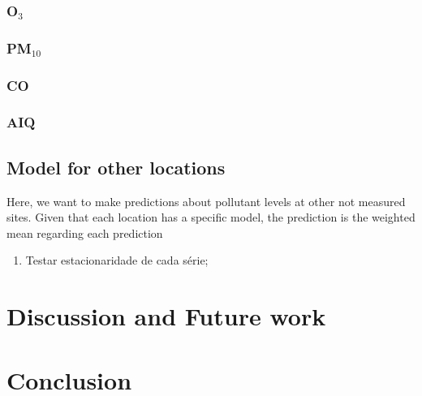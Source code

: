 \subsubsection{O\texorpdfstring{$_3$}{3}}

\subsubsection{PM\texorpdfstring{$_{10}$}{10}}

\subsubsection{CO}

\subsubsection{AIQ}

\subsection{Model for other locations}

Here, we want to make predictions about pollutant levels at other not measured
sites. Given that each location has a specific model, the prediction
is the weighted mean regarding each prediction 

\begin{enumerate}
    \item Testar estacionaridade de cada série;
\end{enumerate}



\section{Discussion and Future work}
\label{sec:discussion}


\section{Conclusion}
\label{sec:conclusion}
